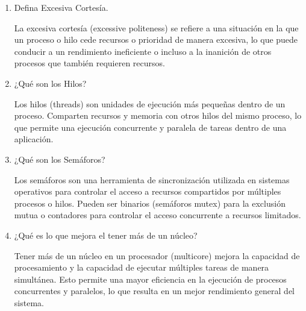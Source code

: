 \documentclass[12pt, a4paper]{article} %
\begin{document}
\begin{enumerate}
	\item Defina Excesiva Cortesía.

	La excesiva cortesía (excessive politeness) se refiere a una situación en la que un proceso o hilo cede recursos o prioridad de manera excesiva, lo que puede conducir a un rendimiento ineficiente o incluso a la inanición de otros procesos que también requieren recursos.


	\item ¿Qué son los Hilos?

	Los hilos (threads) son unidades de ejecución más pequeñas dentro de un proceso. Comparten recursos y memoria con otros hilos del mismo proceso, lo que permite una ejecución concurrente y paralela de tareas dentro de una aplicación.

	\item ¿Qué son los Semáforos?

	Los semáforos son una herramienta de sincronización utilizada en sistemas operativos para controlar el acceso a recursos compartidos por múltiples procesos o hilos. Pueden ser binarios (semáforos mutex) para la exclusión mutua o contadores para controlar el acceso concurrente a recursos limitados.


	\item ¿Qué es lo que mejora el tener más de un núcleo?

	Tener más de un núcleo en un procesador (multicore) mejora la capacidad de procesamiento y la capacidad de ejecutar múltiples tareas de manera simultánea. Esto permite una mayor eficiencia en la ejecución de procesos concurrentes y paralelos, lo que resulta en un mejor rendimiento general del sistema.	
\end{enumerate}


\nocite{*} %

\clearpage


\end{document}
